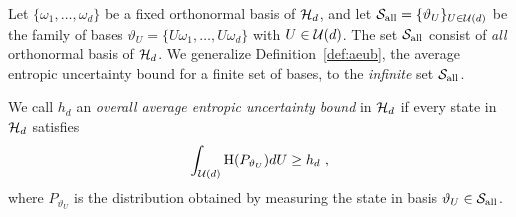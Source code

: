 \def\all{\text{\rm all}}

Let $\{\omega_1, \ldots, \omega_d\}$ be a fixed orthonormal basis of
$\mathcal{H}_d$, and let $\bset_{\all} = \{\vartheta_U\}_{U \in \cU(d)}$ be the
family of bases $\vartheta_U = \{U \omega_1, \ldots, U \omega_d\}$
with $U \in \mathcal{U}(d)$. The set $\bset_{\all}$ consist of {\em all}
orthonormal basis of $\mathcal{H}_d$. We generalize Definition~\ref{def:aeub},
the average entropic uncertainty bound for a finite set of bases, to
the {\em infinite} set $\bset_{\all}$.
\begin{definition}
We call $h_d$ an {\em overall average entropic uncertainty bound} in $\mathcal{H}_d$ if every state in $\mathcal{H}_d$ satisfies
  \[
     \int_{\cU(d)} \H(P_{\vartheta_U}) d U \geq h_d \ ,
  \]
  where $P_{\vartheta_U}$ is the distribution obtained by measuring the state in basis $\vartheta_U \in \bset_{\all} $. 
  \end{definition}

